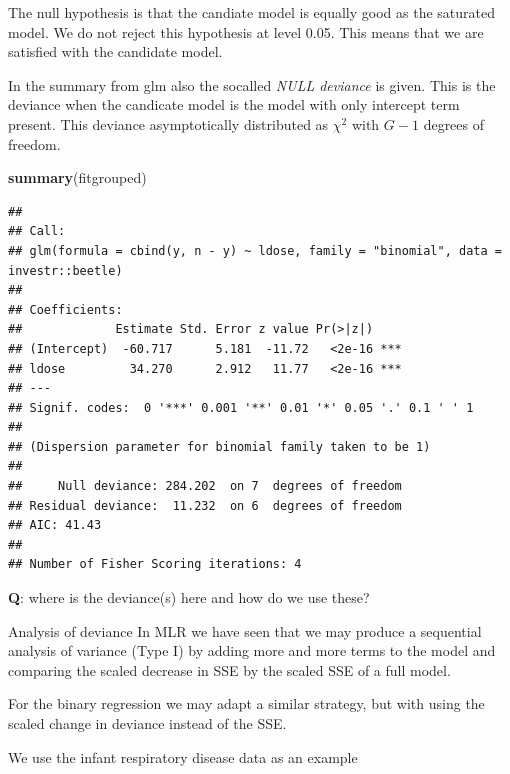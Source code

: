 \documentclass[
  ignorenonframetext,
]{beamer}
\newenvironment{Shaded}{\begin{snugshade}}{\end{snugshade}}
\newcommand{\FunctionTok}[1]{\textcolor[rgb]{0.13,0.29,0.53}{\textbf{#1}}}
\newcommand{\NormalTok}[1]{#1}
\begin{document}
\begin{frame}
The null hypothesis is that the candiate model is equally good as the
saturated model. We do not reject this hypothesis at level 0.05. This
means that we are satisfied with the candidate model.

In the summary from glm also the socalled \emph{NULL deviance} is given.
This is the deviance when the candicate model is the model with only
intercept term present. This deviance asymptotically distributed as
\(\chi^2\) with \(G-1\) degrees of freedom.
\end{frame}

\begin{frame}[fragile]
\footnotesize

\begin{Shaded}
\begin{Highlighting}[]
\FunctionTok{summary}\NormalTok{(fitgrouped)}
\end{Highlighting}
\end{Shaded}

\begin{verbatim}
## 
## Call:
## glm(formula = cbind(y, n - y) ~ ldose, family = "binomial", data = investr::beetle)
## 
## Coefficients:
##             Estimate Std. Error z value Pr(>|z|)    
## (Intercept)  -60.717      5.181  -11.72   <2e-16 ***
## ldose         34.270      2.912   11.77   <2e-16 ***
## ---
## Signif. codes:  0 '***' 0.001 '**' 0.01 '*' 0.05 '.' 0.1 ' ' 1
## 
## (Dispersion parameter for binomial family taken to be 1)
## 
##     Null deviance: 284.202  on 7  degrees of freedom
## Residual deviance:  11.232  on 6  degrees of freedom
## AIC: 41.43
## 
## Number of Fisher Scoring iterations: 4
\end{verbatim}

\normalsize

\textbf{Q}: where is the deviance(s) here and how do we use these?
\end{frame}

\begin{frame}
\begin{block}{Analysis of deviance}
\protect\hypertarget{analysis-of-deviance}{}
In MLR we have seen that we may produce a sequential analysis of
variance (Type I) by adding more and more terms to the model and
comparing the scaled decrease in SSE by the scaled SSE of a full model.

For the binary regression we may adapt a similar strategy, but with
using the scaled change in deviance instead of the SSE.

We use the infant respiratory disease data as an example
\end{block}
\end{frame}
\end{document}
